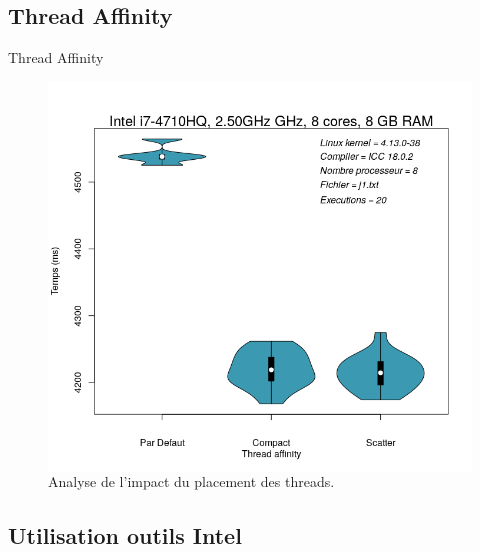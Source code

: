 \documentclass{beamer}
\begin{document}
\subsection{Thread Affinity}
\begin{frame}{Thread Affinity}
	\begin{figure}
	\begin{columns}
      \caption{Analyse de l'impact du placement des threads.\label{Fig:thread_affinity}}
      \includegraphics[width=\textwidth]{defaultVSscatterVScompact.png}
    \end{columns}	
	\end{figure}
\end{frame}

\subsection{Utilisation outils Intel}
\end{document}
